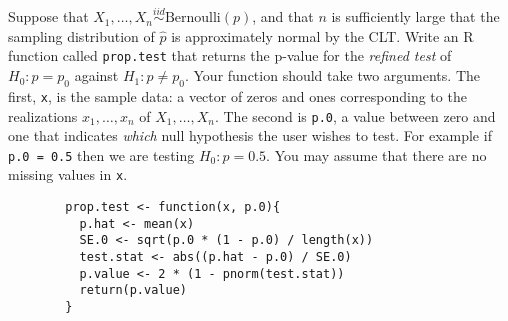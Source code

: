 \documentclass[addpoints,12pt]{exam}
\begin{document}
\begin{questions}


\question[20] Suppose that $X_1, \hdots, X_n \overset{iid}{\sim} \mbox{Bernoulli}(p)$, and that $n$ is sufficiently large that the sampling distribution of $\widehat{p}$ is approximately normal by the CLT. Write an R function called \texttt{prop.test} that returns the p-value for the \emph{refined test} of $H_0\colon p = p_0$ against $H_1 \colon p \neq p_0$. Your function should take two arguments. The first, \texttt{x}, is the sample data: a vector of zeros and ones corresponding to the realizations $x_1, \hdots, x_n$ of $X_1, \hdots, X_n$. The second is \texttt{p.0}, a value between zero and one that indicates \emph{which} null hypothesis the user wishes to test. For example if \texttt{p.0 = 0.5} then we are testing $H_0\colon p = 0.5$. You may assume that there are no missing values in \texttt{x}.
\begin{solution}[6cm]
	\begin{verbatim}
		prop.test <- function(x, p.0){
		  p.hat <- mean(x)
		  SE.0 <- sqrt(p.0 * (1 - p.0) / length(x))
		  test.stat <- abs((p.hat - p.0) / SE.0)
		  p.value <- 2 * (1 - pnorm(test.stat))
		  return(p.value)
		}
	\end{verbatim}
\end{solution}



\end{questions}
\end{document}
